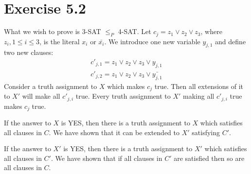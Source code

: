 \section*{Exercise 5.2}
What we wish to prove is 3-SAT $\leq _P$ 4-SAT. Let $c_j = z_1 \lor z_2 \lor z_3$, where $z_i, 1 \leq i \leq 3$, is the literal $x_i$ or $\bar{x_i}$. We introduce one new variable $y_{j,1}$ and define two new clauses:
\begin{align*}
	c'_{j,1} = z_1 \lor z_2 \lor z_3 \lor y_{j,1} \\
	c'_{j,2} = z_1 \lor z_2 \lor z_3 \lor \bar{y_{j,1}}
\end{align*}
Consider a truth assignment to $X$ which makes $c_j$ true. Then all extensions of it to $X'$ will make all $c'_{j,i}$ true. Every truth assignment to $X'$ making all $c'_{j,i}$ true makes $c_j$ true.

If the answer to $X$ is YES, then there is a truth assignment to $X$ which satisfies all clauses in $C$. We have shown that it can be extended to $X'$ satisfying $C'$.

If the answer to $X'$ is YES, then there is a truth assignment to $X'$ which satisfies all clauses in $C'$. We have shown that if all clauses in $C'$ are satisfied then so are all clauses in $C$.